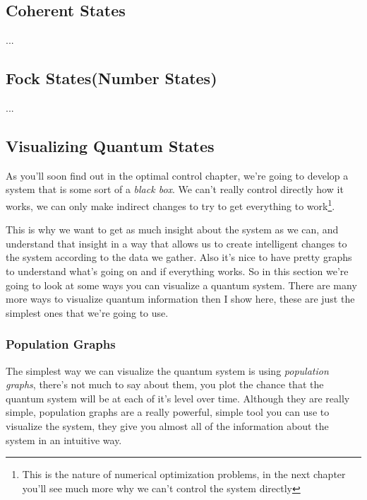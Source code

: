 \documentclass[english, a4paper, 12pt, twoside]{article}
\numberwithin{equation}{section} %
\begin{document}
\subsection{Coherent States}
...
\subsection{Fock States(Number States)}
...
\subsection{Visualizing Quantum States}
As you'll soon find out in the optimal control chapter, we're going to develop a system that is some sort of a \textit{black box}. We can't really control directly how it works, we can only make indirect changes to try to get everything to work\footnote{This is the nature of numerical optimization problems, in the next chapter you'll see much more why we can't control the system directly}.

This is why we want to get as much insight about the system as we can, and understand that insight in a way that allows us to create intelligent changes to the system according to the data we gather. Also it's nice to have pretty graphs to understand what's going on and if everything works. So in this section we're going to look at some ways you can visualize a quantum system. There are many more ways to visualize quantum information then I show here, these are just the simplest ones that we're going to use.

\subsubsection{Population Graphs}
The simplest way we can visualize the quantum system is using \textit{population graphs}, there's not much to say about them, you plot the chance that the quantum system will be at each of it's level over time. Although they are really simple, population graphs are a really powerful, simple tool you can use to visualize the system, they give you almost all of the information about the system in an intuitive way.
\end{document}
